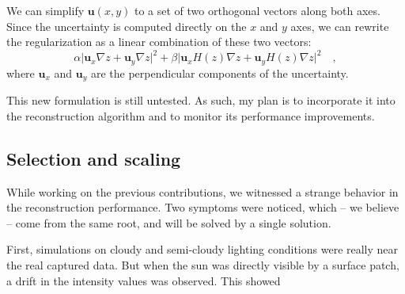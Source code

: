 \documentclass{report}
\begin{document}
We can simplify $\mathbf{u}(x,y)$ to a set of two orthogonal vectors along both axes. Since the uncertainty is computed directly on the $x$ and $y$ axes, we can rewrite the regularization as a linear combination of these two vectors:
\begin{equation}
\alpha \lvert \mathbf{u}_x \nabla z + \mathbf{u}_y \nabla z\rvert ^2 +
\beta \lvert \mathbf{u}_x H(z)\nabla z + \mathbf{u}_y H(z)\nabla z\rvert ^2
\quad,
\end{equation}
where $\mathbf{u}_x$ and $\mathbf{u}_y$ are the perpendicular components of the uncertainty.

This new formulation is still untested. As such, my plan is to incorporate it into the reconstruction algorithm and to monitor its performance improvements.


\subsection{Selection and scaling}
While working on the previous contributions, we witnessed a strange behavior in the reconstruction performance. Two symptoms were noticed, which -- we believe -- come from the same root, and will be solved by a single solution.

First, simulations on cloudy and semi-cloudy lighting conditions were really near the real captured data. But when the sun was directly visible by a surface patch, a drift in the intensity values was observed. This showed
\end{document}
